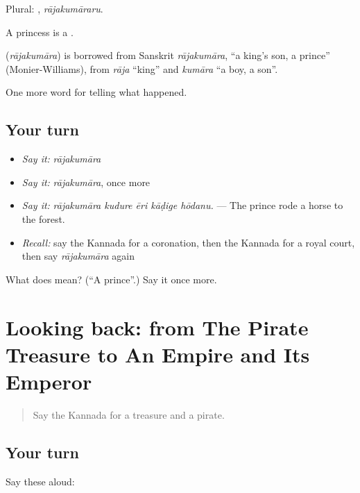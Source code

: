 Plural: , \emph{rājakumāraru}.

A princess is a .

\begin{cousinweb}
\textbf{} (\emph{rājakumāra}) is borrowed from Sanskrit \emph{rājakumāra}, \textquotedblleft{}a king's son, a prince\textquotedblright{} (Monier-Williams), from \emph{rāja} \textquotedblleft{}king\textquotedblright{} and \emph{kumāra} \textquotedblleft{}a boy, a son\textquotedblright{}.
\end{cousinweb}

\begin{grammarlens}[title={What you've built}]
One more word for telling what happened.
\end{grammarlens}

\subsection*{Your turn}
\begin{itemize}
\raggedright
  \item \emph{Say it:} \emph{rājakumāra}
  \item \emph{Say it:} \emph{rājakumāra}, once more
  \item \emph{Say it:} \emph{rājakumāra kudure ēri kāḍige hōdanu.} — The prince rode a horse to the forest.
  \item \emph{Recall:} say the Kannada for a coronation, then the Kannada for a royal court, then say \emph{rājakumāra} again
\end{itemize}

\begin{tcolorbox}[breakable,colback=teal!4,colframe=teal!35!black,title={Before you move on}]
What does  mean? (\textquotedblleft{}A prince\textquotedblright{}.) Say it once more.
\end{tcolorbox}
\section[(dialogue)]{Looking back: from The Pirate Treasure to An Empire and Its Emperor}

\label{lesson:KA-R354-review-348-354}



\begin{quote}
Say the Kannada for a treasure and a pirate.
\end{quote}

\subsection*{Your turn}
Say these aloud:

